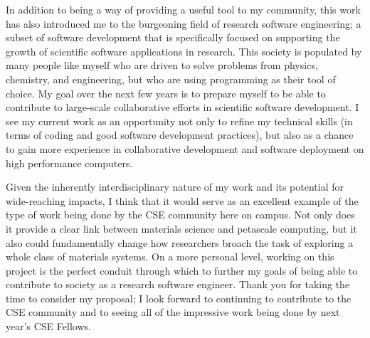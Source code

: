 \documentclass{article}
\begin{document}
In addition to being a way of providing a useful tool to my community, this work has also introduced me to the burgeoning field of research software engineering; a subset of software development that is specifically focused on supporting the growth of scientific software applications in research. This society is populated by many people like myself who are driven to solve problems from physics, chemistry, and engineering, but who are using programming as their tool of choice. My goal over the next few years is to prepare myself to be able to contribute to large-scale collaborative efforts in scientific software development. I see my current work as an opportunity not only to refine my technical skills (in terms of coding and good software development practices), but also as a chance to gain more experience in collaborative development and software deployment on high performance computers.

Given the inherently interdisciplinary nature of my work and its potential for wide-reaching impacts, I think that it would serve as an excellent example of the type of work being done by the CSE community here on campus. Not only does it provide a clear link between materials science and petascale computing, but it also could fundamentally change how researchers broach the task of exploring a whole class of materials systems. On a more personal level, working on this project is the perfect conduit through which to further my goals of being able to contribute to society as a research software engineer. Thank you for taking the time to consider my proposal; I look forward to continuing to contribute to the CSE community and to seeing all of the impressive work being done by next year's CSE Fellows.



\end{document}
